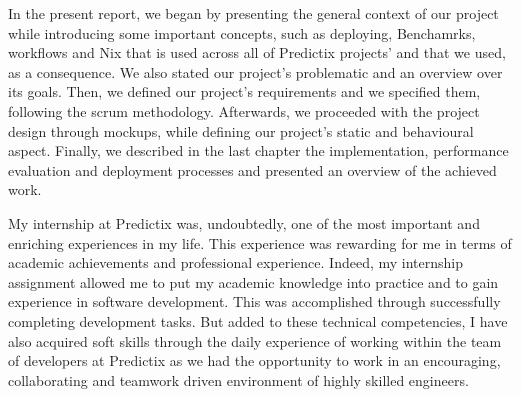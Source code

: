 In the present report, we began by presenting the general context of our
project while introducing some important concepts, such as deploying,
Benchamrks, workflows and Nix that is used across all of Predictix projects’ and that
we used, as a consequence. We also stated our project’s problematic and an
overview over its goals. Then, we defined our project’s requirements and we
specified them, following the scrum methodology. Afterwards, we proceeded with
the project design through mockups, while defining our project’s static and
behavioural aspect. Finally, we described in the last chapter the
implementation, performance evaluation and deployment processes and presented an
overview of the achieved work.

My internship at Predictix was, undoubtedly, one of the most important and
enriching experiences in my life. This experience was rewarding for me in
terms of academic achievements and professional experience. Indeed, my
internship assignment allowed me to put my academic knowledge into practice
and to gain experience in software development. This was accomplished through
successfully completing development tasks. But added to these technical
competencies, I have also acquired soft skills through the daily experience of
working within the team of developers at Predictix as we had the opportunity to
work in an encouraging, collaborating and teamwork driven environment of
highly skilled engineers.
